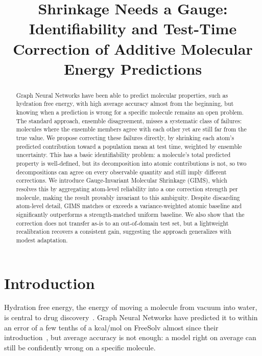 \documentclass{article}
\title{Shrinkage Needs a Gauge: Identifiability and Test-Time Correction of Additive Molecular Energy Predictions}
\begin{document}
\maketitle

\begin{abstract}
  Graph Neural Networks have been able to predict molecular properties, such as hydration free energy, with high average accuracy almost from the beginning, but knowing when a prediction is wrong for a specific molecule remains an open problem. The standard approach, ensemble disagreement, misses a systematic class of failures: molecules where the ensemble members agree with each other yet are still far from the true value. We propose correcting these failures directly, by shrinking each atom's predicted contribution toward a population mean at test time, weighted by ensemble uncertainty. This has a basic identifiability problem: a molecule's total predicted property is well-defined, but its decomposition into atomic contributions is not, so two decompositions can agree on every observable quantity and still imply different corrections. We introduce Gauge-Invariant Molecular Shrinkage (GIMS), which resolves this by aggregating atom-level reliability into a one correction strength per molecule, making the result provably invariant to this ambiguity. Despite discarding atom-level detail, GIMS matches or exceeds a variance-weighted atomic baseline and significantly outperforms a strength-matched uniform baseline. We also show that the correction does not transfer as-is to an out-of-domain test set, but a lightweight recalibration recovers a consistent gain, suggesting the approach generalizes with modest adaptation.
\end{abstract}

\section{Introduction}
\label{sec:intro}

Hydration free energy, the energy of moving a molecule from vacuum into
water, is central to drug discovery~\cite{mobley2014freesolv}. Graph Neural Networks have predicted it to within an error of a few tenths of a kcal/mol on FreeSolv almost since their introduction~\cite{zhang2022}, but average accuracy is not enough: a model
right on average can still be confidently wrong on a specific molecule.
\end{document}
